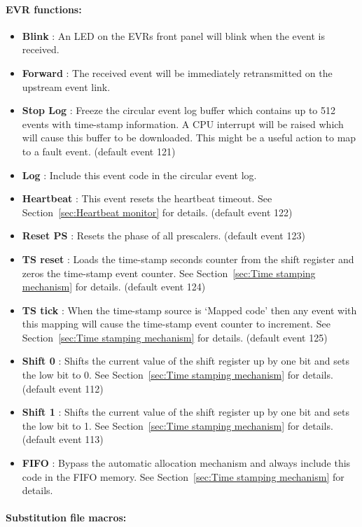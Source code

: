 \documentclass[12pt,a4paper]{article}
\begin{document}
\paragraph{EVR functions:}
\begin{itemize}
\item
  \textbf{Blink} : An LED on the EVRs front panel will blink when the
  event is received.
\item
  \textbf{Forward} : The received event will be immediately retransmitted
  on the upstream event link.
\item
  \textbf{Stop Log} : Freeze the circular event log buffer which contains up to 512 events with time-stamp information. A CPU interrupt will be raised which will cause this buffer to be downloaded. This might be a useful action to map to a fault event. (default event 121)
\item
  \textbf{Log} : Include this event code in the circular event log.
\item
  \textbf{Heartbeat} : This event resets the heartbeat timeout. See Section~\ref{sec:Heartbeat monitor} for details. (default event 122)
\item
  \textbf{Reset PS} : Resets the phase of all prescalers. (default event 123)
\item
  \textbf{TS reset} : Loads the time-stamp seconds counter from the shift register and zeros the time-stamp event counter. See Section~\ref{sec:Time stamping mechanism} for details. (default event 124)
\item
  \textbf{TS tick} : When the time-stamp source is `Mapped code' then any event with this mapping will cause the time-stamp event counter to increment. See Section~\ref{sec:Time stamping mechanism} for details. (default event 125)
\item
  \textbf{Shift 0} : Shifts the current value of the shift register up by one bit and sets the low bit to 0. See Section~\ref{sec:Time stamping mechanism} for details. (default event 112)
\item
  \textbf{Shift 1} : Shifts the current value of the shift register up by one bit and sets the low bit to 1. See Section~\ref{sec:Time stamping mechanism} for details. (default event 113)
\item
  \textbf{FIFO} : Bypass the automatic allocation mechanism and always include this code in the FIFO memory. See Section~\ref{sec:Time stamping mechanism} for details.
\end{itemize}

\paragraph{Substitution file macros:}
\end{document}
